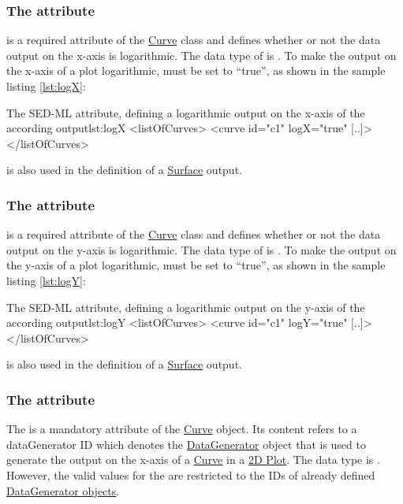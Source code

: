 \subsubsection{The  attribute}
\label{sec:logX}
 is a required attribute of the \hyperref[class:curve]{Curve} class and defines whether or not the data output on the x-axis is logarithmic. The data type of  is . 
To make the output on the x-axis of a plot logarithmic,  must be set to ``true'', as shown in the sample listing \ref{lst:logX}: 
\begin{myXmlLst}{The SED-ML   attribute, defining a logarithmic output on the x-axis of the according output}{lst:logX}
<listOfCurves>
  <curve id="c1"  logX="true" [..]>
</listOfCurves>
\end{myXmlLst}
 is also used in the definition of a \hyperref[class:surface]{Surface} output.

\subsubsection{The  attribute}
\label{sec:logY}
 is a required attribute of the \hyperref[class:curve]{Curve} class and defines whether or not the data output on the y-axis is logarithmic. The data type of  is . 
To make the output on the y-axis of a plot logarithmic,  must be set to ``true'', as shown in the sample listing \ref{lst:logY}: 
\begin{myXmlLst}{The SED-ML  attribute, defining a logarithmic output on the y-axis of the according output}{lst:logY}
<listOfCurves>
  <curve id="c1"  logY="true" [..]>
</listOfCurves>
\end{myXmlLst}
 is also used in the definition of a \hyperref[class:surface]{Surface} output.

\subsubsection{The  attribute}
\label{sec:xDataReference}
The  is a mandatory attribute of the \hyperref[class:curve]{Curve} object. Its content refers to a dataGenerator ID which denotes the \hyperref[class:dataGenerator]{DataGenerator} object that is used to generate the output on the x-axis of a \hyperref[class:curve]{Curve} in a \hyperref[class:plot2D]{2D Plot}. 
The  data type is . However, the valid values for the  are restricted to the IDs of already defined \hyperref[class:dataGenerator]{DataGenerator objects}.


